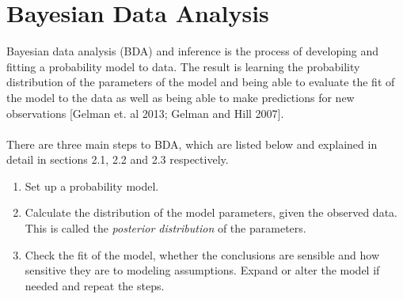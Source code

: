 \documentclass[12pt, oneside]{article}
\begin{document}
\section{Bayesian Data Analysis}
Bayesian data analysis (BDA) and inference is the process of developing and fitting a probability model to data. The result is learning the probability distribution of the parameters of the model and being able to evaluate the fit of the model to the data as well as being able to make predictions for new observations [Gelman et. al 2013; Gelman and Hill 2007].
\\
\\
There are three main steps to BDA, which are listed below and explained in detail in sections 2.1, 2.2 and 2.3 respectively.
\begin{enumerate}
\item{Set up a probability model.}
\item{Calculate the distribution of the model parameters, given the observed data. This is called the \textit{posterior distribution} of the parameters.}
\item{Check the fit of the model, whether the conclusions are sensible and how sensitive they are to modeling assumptions. Expand or alter the model if needed and repeat the steps.}
\end{enumerate}
\end{document}
